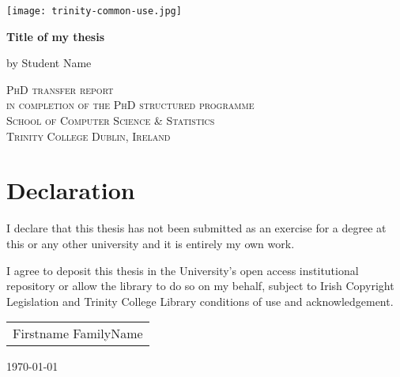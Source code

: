 \documentclass[english,a4paper,11pt,oneside,onecolumn]{book}
\begin{document}
\renewcommand{\footrulewidth}{1pt}







\begin{titlepage}
	\centering
	
\texttt{[image: trinity-common-use.jpg]}\par\vspace{2cm}
%
	\vspace{2cm}
	{\huge\bfseries Title of my thesis\par}
	\vspace{1cm}
	{\scshape \par}
	\vspace{2cm}
	{\Large by Student Name \par}
 \vspace{1cm}
{\scshape 
PhD transfer report \\  %
in completion of the PhD structured programme \\
School of Computer Science \& Statistics\\ 
Trinity College Dublin, Ireland\\
}
\end{titlepage}

\clearpage

\chapter*{Declaration}

I declare that this thesis has not been submitted as an exercise for a degree at this or
any other university and it is entirely my own work.


\vspace{1cm}

I agree to deposit this thesis in the University’s open access institutional repository or
allow the library to do so on my behalf, subject to Irish Copyright Legislation and
Trinity College Library conditions of use and acknowledgement.


\vspace{3cm}
\begin{flushright}

\begin{tabular}{l}
\hline
Firstname FamilyName\\
\end{tabular}

\vspace{1cm}

\today
\end{flushright}
\end{document}
